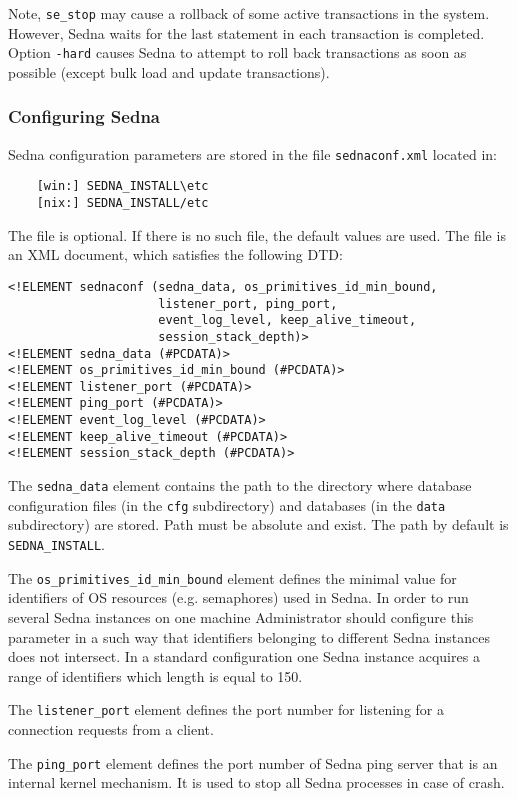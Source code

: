 \documentclass[a4paper,12pt]{article}
\begin{document}
Note, \verb!se_stop! may cause a rollback of some active transactions in the system. However, Sedna waits for the last statement in each transaction is completed.
Option \verb!-hard! causes Sedna to attempt to roll back transactions as soon as possible (except bulk load and update transactions).

\subsubsection{Configuring Sedna}
\label{sec:ConfigSedna}
Sedna configuration parameters are stored in the file \verb!sednaconf.xml!
located in:
\begin{verbatim}
	[win:] SEDNA_INSTALL\etc
	[nix:] SEDNA_INSTALL/etc
\end{verbatim}
The file is optional. If there is no such file, the default values are used.
The file is an XML document, which satisfies the following DTD:

\begin{verbatim}
<!ELEMENT sednaconf (sedna_data, os_primitives_id_min_bound, 
                     listener_port, ping_port,
                     event_log_level, keep_alive_timeout, 
                     session_stack_depth)>
<!ELEMENT sedna_data (#PCDATA)>
<!ELEMENT os_primitives_id_min_bound (#PCDATA)>
<!ELEMENT listener_port (#PCDATA)>
<!ELEMENT ping_port (#PCDATA)>
<!ELEMENT event_log_level (#PCDATA)>
<!ELEMENT keep_alive_timeout (#PCDATA)>
<!ELEMENT session_stack_depth (#PCDATA)>
\end{verbatim}

The \verb!sedna_data! element contains the path to the directory where
database configuration files (in the \verb!cfg! subdirectory) and
databases (in the \verb!data! subdirectory) are stored. Path must be absolute
and exist. The path by default is \verb!SEDNA_INSTALL!.

The \verb!os_primitives_id_min_bound! element defines the minimal value for
identifiers of OS resources (e.g. semaphores) used in Sedna. In order to run
several Sedna instances on one machine Administrator should configure this
parameter in a such way that identifiers belonging to different Sedna instances
does not intersect. In a standard configuration one Sedna instance acquires a
range of identifiers which length is equal to 150.

The \verb!listener_port! element defines the port number for listening for a
connection requests from a client.

The \verb!ping_port! element defines the port number of Sedna ping server that
is an internal kernel mechanism. It is used to stop all Sedna processes in case
of crash.
\end{document}
